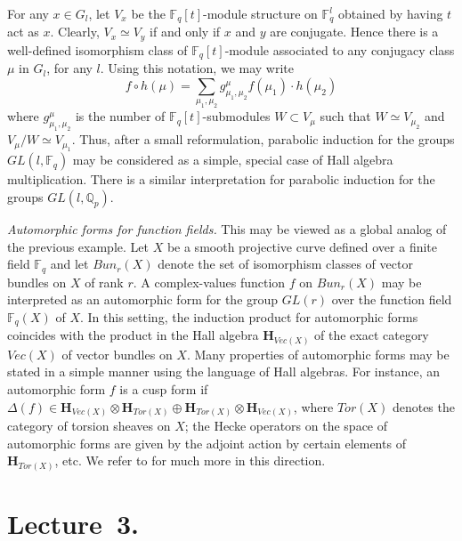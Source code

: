 \documentclass[a4paper,10pt]{amsart}
\def\H{\mathbf{H}}
\numberwithin{equation}{section}
\begin{document}
For any $x \in G_l$, let $V_x$ be the $\mathbb{F}_q[t]$-module structure on $\mathbb{F}_q^l$ obtained by having $t$ act as $x$. Clearly, $V_x \simeq V_y$ if and only if $x$ and $y$ are conjugate. Hence there is a well-defined isomorphism class of $\mathbb{F}_q[t]$-module associated to any conjugacy class $\mu$ in $G_l$, for any $l$. Using this notation, we may write
$$f \circ h (\mu)=\sum_{\mu_1,\mu_2} g_{\mu_1,\mu_2}^\mu f(\mu_1) \cdot h(\mu_2)$$
where $g_{\mu_1,\mu_2}^{\mu}$ is the number of $\mathbb{F}_q[t]$-submodules $W \subset V_{\mu}$ such that $W \simeq V_{\mu_2}$ and $V_{\mu}/W \simeq V_{\mu_1}$. Thus, after a small reformulation, parabolic induction for the groups $GL(l,\mathbb{F}_q)$ may be considered as a simple, special case of Hall algebra multiplication. There is a similar interpretation for parabolic induction for the groups $GL(l,\mathbb{Q}_p)$.

\vspace{.2in}

\noindent
\textit{Automorphic forms for function fields.}  This may be viewed as a global analog of the previous example. Let $X$ be a smooth projective curve defined over a finite field $\mathbb{F}_q$ and let $Bun_{r}(X)$ denote the set of isomorphism classes of vector bundles on $X$ of rank $r$. A complex-values function $f$ on $Bun_r(X)$ may be interpreted as an automorphic form for the group $GL(r)$ over the function field $\mathbb{F}_q(X)$ of $X$. In this setting, the induction product for automorphic forms coincides with the product in the Hall algebra $\H_{Vec(X)}$ of the exact category $Vec(X)$ of vector bundles on $X$. Many properties of automorphic forms may be stated in a simple manner using the language of Hall algebras. For instance, an automorphic form $f$ is a cusp form if $\Delta(f) \in \H_{Vec(X)} \otimes \H_{Tor(X)} \oplus \H_{Tor(X)} \otimes \H_{Vec(X)}$, where $Tor(X)$ denotes the category of torsion sheaves on $X$; the Hecke operators on the space of automorphic forms are given by the adjoint action by certain elements of $\H_{Tor(X)}$, etc. We refer to \cite{Kap1} for much more in this direction.

\vspace{.15in}

\newpage

\section{Lecture~3.}
\end{document}
